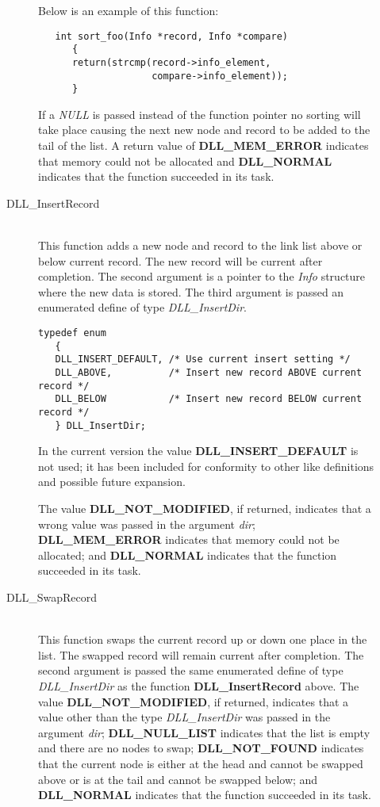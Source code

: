 \documentclass[10pt,letterpaper,titlepage]{article}
\begin{document}
\begin{description}
\begin{description}
 Below is an example of this function:

\begin{verbatim}
   int sort_foo(Info *record, Info *compare)
      {
      return(strcmp(record->info_element,
                    compare->info_element));
      }

\end{verbatim}
 
 If a \emph{NULL} is passed instead of the function pointer no sorting will take place causing the next new node and record to be added to the tail of the list.  A return value of \textbf{DLL\_MEM\_ERROR} indicates that memory could not be allocated and \textbf{DLL\_NORMAL} indicates that the function succeeded in its task.

\item[DLL\_InsertRecord]\quad\\
 This function adds a new node and record to the link list above or below current record.  The new record will be current after completion.  The second argument is a pointer to the \emph{Info} structure where the new data is stored.  The third argument is passed an enumerated define of type \emph{DLL\_InsertDir}.

\small
\begin{verbatim}
typedef enum
   {
   DLL_INSERT_DEFAULT, /* Use current insert setting */
   DLL_ABOVE,          /* Insert new record ABOVE current record */
   DLL_BELOW           /* Insert new record BELOW current record */ 
   } DLL_InsertDir;
\end{verbatim}
\normalsize

 In the current version the value \textbf{DLL\_INSERT\_DEFAULT} is not used; it has been included for conformity to other like definitions and possible future expansion.
\vspace{8pt}

\noindent
 The value \textbf{DLL\_NOT\_MODIFIED}, if returned, indicates that a wrong value was passed in the argument \emph{dir}; \textbf{DLL\_MEM\_ERROR} indicates that memory could not be allocated; and \textbf{DLL\_NORMAL} indicates that the function succeeded in its task.

\item[DLL\_SwapRecord]\quad\\
 This function swaps the current record up or down one place in the list.  The swapped record will remain current after completion.  The second argument is passed the same enumerated define of type \emph{DLL\_InsertDir} as the function \textbf{DLL\_InsertRecord} above.  The value \textbf{DLL\_NOT\_MODIFIED}, if returned, indicates that a value other than the type \emph{DLL\_InsertDir} was passed in the argument \emph{dir}; \textbf{DLL\_NULL\_LIST} indicates that the list is empty and there are no nodes to swap; \textbf{DLL\_NOT\_FOUND} indicates that the current node is either at the head and cannot be swapped above or is at the tail and cannot be swapped below; and \textbf{DLL\_NORMAL} indicates that the function succeeded in its task.


\end{description}
\end{description}
\end{document}
